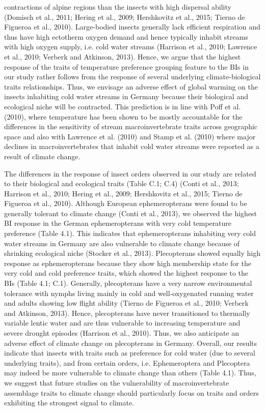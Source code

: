 \noindent contractions of alpine regions than the insects with high dispersal ability (Domisch et al., 2011; Hering et al., 2009; Hershkovitz et al., 2015; Tierno de Figueroa et al., 2010). Large-bodied insects generally lack efficient respiration and thus have high ectotherm oxygen demand and hence typically inhabit streams with high oxygen supply, i.e. cold water streams (Harrison et al., 2010; Lawrence et al., 2010; Verberk and Atkinson, 2013). Hence, we argue that the highest response of the traits of temperature preference grouping feature to the BIs in our study rather follows from the response of several underlying climate-biological traits relationships. Thus, we envisage an adverse effect of global warming on the insects inhabiting cold water streams in Germany because their biological and ecological niche will be contracted. This prediction is in line with Poff et al. (2010), where temperature has been shown to be mostly accountable for the differences in the sensitivity of stream macroinvertebrate traits across geographic space and also with Lawrence et al. (2010) and Stamp et al. (2010) where major declines in macroinvertebrates that inhabit cold water streams were reported as a result of climate change.

The differences in the response of insect orders observed in our study are related to their biological and ecological traits (Table C.1; C.4) (Conti et al., 2013; Harrison et al., 2010; Hering et al., 2009; Hershkovitz et al., 2015; Tierno de Figueroa et al., 2010). Although European ephemeropterans were found to be generally tolerant to climate change (Conti et al., 2013), we observed the highest BI response in the German ephemeropterans with very cold temperature preference (Table 4.1). This indicates that ephemeropterans inhabiting very cold water streams in Germany are also vulnerable to climate change because of shrinking ecological niche (Stocker et al., 2013). Plecopterans showed equally high response as ephemeropterans because they show high membership state for the very cold and cold preference traits, which showed the highest response to the BIs (Table 4.1; C.1). Generally, plecopterans have a very narrow environmental tolerance with nymphs living mainly in cold and well-oxygenated running water and adults showing low flight ability (Tierno de Figueroa et al., 2010; Verberk and Atkinson, 2013). Hence, plecopterans have never transitioned to thermally variable lentic water and are thus vulnerable to increasing temperature and severe drought episodes (Harrison et al., 2010). Thus, we also anticipate an adverse effect of climate change on plecopterans in Germany. Overall, our results indicate that insects with traits such as preference for cold water (due to several underlying traits), and from certain orders, i.e. Ephemeroptera and Plecoptera may indeed be more vulnerable to climate change than others (Table 4.1). Thus, we suggest that future studies on the vulnerability of macroinvertebrate assemblage traits to climate change should particularly focus on traits and orders exhibiting the strongest signal to climate.

